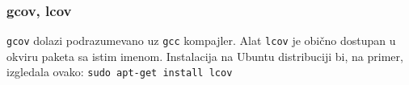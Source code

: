 \subsubsection{gcov, lcov}\label{gcov-lcov}

\texttt{gcov} dolazi podrazumevano uz \texttt{gcc} kompajler. Alat \texttt{lcov} je obično dostupan u okviru paketa sa istim imenom. Instalacija na Ubuntu distribuciji bi, na primer, izgledala ovako: \texttt{sudo\ apt-get\ install\ lcov}

